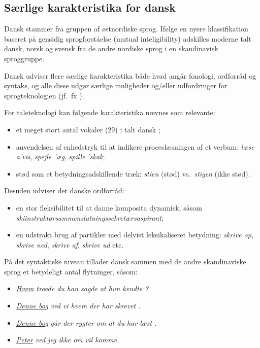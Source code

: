 \documentclass[]{../../metanetpaper}
\begin{document}
\begin{multicols}{2}
\subsection{S\ae rlige karakteristika for dansk}

 Dansk stammer fra gruppen af \o stnordiske sprog. If\o lge en nyere klassifikation baseret \mbox{p\aa} gensidig sprogforst\aa else (mutual inteligibility) adskilles moderne talt dansk, norsk og svensk fra de andre nordiske sprog i en skandinavisk sproggruppe. 
 
Dansk udviser flere s\ae rlige karakteristika b\aa de hvad ang\aa r fonologi, ordforr\aa d og syntaks, og alle disse udg\o r s\ae rlige muligheder og/eller udfordringer for sprogteknologien (jf.\ fx \cite{Gregersen, Hellan, Braasch}).


For taleteknologi kan f\o lgende karakteristika n\ae vnes som relevante:
\begin{itemize}
\item 	et meget stort antal vokaler (29) i talt dansk \cite{dansk};
\item 	anvendelsen af enhedstryk til at indikere procesl\ae sningen af et verbum: {\it l\ae se a'vis}, {\it spejle '\ae g}, {\it spille 'skak};
\item 	st\o d som et betydningsadskillende tr\ae k: {\it stien} (st\o d) vs.\ {\it stigen} (ikke st\o d).
\end{itemize}
Desuden udviser det danske ordforr\aa d:
\begin{itemize}
\item 	en stor fleksibilitet til at danne komposita dynamisk, s\aa som {\it skiinstrukt\o rsammenslut\-nings\-sekret\ae rs\-as\-pirant};
\item 	en udstrakt brug af partikler med delvist leksikaliseret betydning: {\it skrive op}, {\it skrive ned}, {\it skrive af}, {\it skrive ud} etc.
\end{itemize}
\mbox{P\aa} det syntaktiske niveau tillader dansk sammen med de andre skandinaviske sprog et betydeligt antal flytninger, s\aa som:
\begin{itemize}
\item    {\it \underline{Hvem} troede du han sagde at hun kendte \underline{\hspace{2mm}}?}\\
\item {\it \underline{Denne bog} ved vi hvem der har skrevet \underline{\hspace{2mm}}.} \\
\item {\it \underline{Denne bog} g\aa r der rygter om at du har l\ae st \underline{\hspace{2mm}}.}\\ 
\item {\it \underline{Peter} ved jeg ikke om \underline{\hspace{2mm}} vil komme.}
\end{itemize}


\end{multicols}
\end{document}
